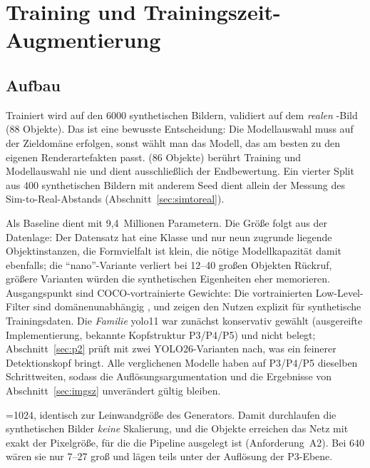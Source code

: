 \chapter{Training und Trainingszeit-Augmentierung}
\label{kap:trainingszeit}

\section{Aufbau}
\label{sec:trainingsaufbau}

 Trainiert wird auf den 6000 synthetischen Bildern,
validiert auf dem \emph{realen} -Bild (88 Objekte). Das ist eine
bewusste Entscheidung: Die Modellauswahl muss auf der Zieldomäne erfolgen, sonst
wählt man das Modell, das am besten zu den eigenen Renderartefakten passt.
 (86 Objekte) berührt Training und Modellauswahl nie und dient
ausschließlich der Endbewertung. Ein vierter Split  aus 400
synthetischen Bildern mit anderem Seed dient allein der Messung des
Sim-to-Real-Abstands (Abschnitt~\ref{sec:simtoreal}).

 Als Baseline dient  mit 9,4~Millionen
Parametern. Die Größe folgt aus der Datenlage: Der Datensatz hat eine Klasse und
nur neun zugrunde liegende Objektinstanzen, die Formvielfalt ist klein, die
nötige Modellkapazität damit ebenfalls; die \enquote{nano}-Variante verliert bei
12--40\px{} großen Objekten Rückruf, größere Varianten würden die synthetischen
Eigenheiten eher memorieren. Ausgangspunkt sind COCO-vortrainierte Gewichte: Die
vortrainierten Low-Level-Filter sind domänenunabhängig \parencite{yosinski2014},
und \textcite{hinterstoisser2018} zeigen den Nutzen explizit für synthetische
Trainingsdaten. Die \emph{Familie} yolo11 war zunächst konservativ gewählt
(ausgereifte Implementierung, bekannte Kopfstruktur P3/P4/P5) und nicht belegt;
Abschnitt~\ref{sec:p2} prüft mit zwei YOLO26-Varianten nach, was ein feinerer
Detektionskopf bringt. Alle verglichenen Modelle haben auf P3/P4/P5 dieselben
Schrittweiten, sodass die Auflösungsargumentation und die Ergebnisse von
Abschnitt~\ref{sec:imgsz} unverändert gültig bleiben.

 =1024, identisch zur Leinwandgröße des
Generators. Damit durchlaufen die synthetischen Bilder \emph{keine} Skalierung,
und die Objekte erreichen das Netz mit exakt der Pixelgröße, für die die Pipeline
ausgelegt ist (Anforderung~A2). Bei 640\px{} wären sie nur 7--27\px{} groß und
lägen teils unter der Auflösung der P3-Ebene.

